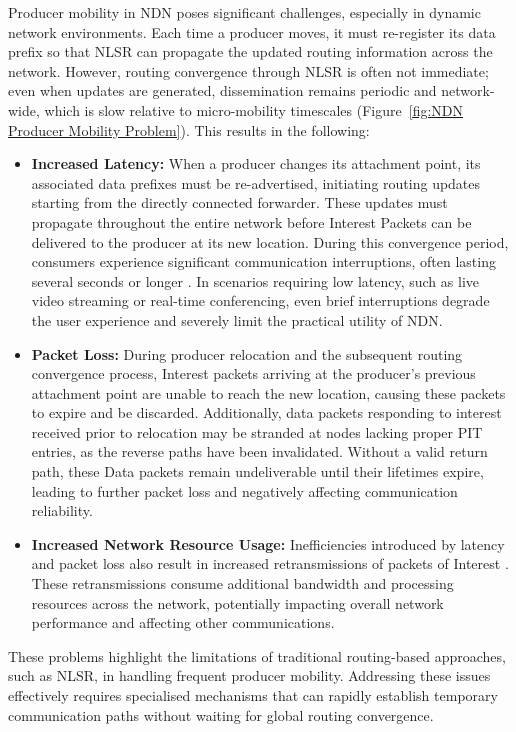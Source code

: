 \documentclass[10pt,conference]{IEEEtran}
\begin{document}
Producer mobility in NDN poses significant challenges, especially in dynamic network environments. Each time a producer moves, it must re-register its data prefix so that NLSR can propagate the updated routing information across the network. However, routing convergence through NLSR is often not immediate; even when updates are generated, dissemination remains periodic and network-wide, which is slow relative to micro-mobility timescales (Figure~\ref{fig:NDN Producer Mobility Problem}).
This results in the following:
\begin{itemize}
\item \textbf{Increased Latency:} When a producer changes its attachment point, its associated data prefixes must be re-advertised, initiating routing updates starting from the directly connected forwarder. These updates must propagate throughout the entire network before Interest Packets can be delivered to the producer at its new location. During this convergence period, consumers experience significant communication interruptions, often lasting several seconds or longer \cite{FIXME}. In scenarios requiring low latency, such as live video streaming or real-time conferencing, even brief interruptions degrade the user experience \cite{FIXME} and severely limit the practical utility of NDN.

\item \textbf{Packet Loss:} During producer relocation and the subsequent routing convergence process, Interest packets arriving at the producer's previous attachment point are unable to reach the new location, causing these packets to expire and be discarded. Additionally, data packets responding to interest received prior to relocation may be stranded at nodes lacking proper PIT entries, as the reverse paths have been invalidated. Without a valid return path, these Data packets remain undeliverable until their lifetimes expire, leading to further packet loss and negatively affecting communication reliability.

\item \textbf{Increased Network Resource Usage:} Inefficiencies introduced by latency and packet loss also result in increased retransmissions of packets of Interest \cite{FIXME}. These retransmissions consume additional bandwidth and processing resources across the network, potentially impacting overall network performance and affecting other communications.

\end{itemize}

These problems highlight the limitations of traditional routing-based approaches, such as NLSR, in handling frequent producer mobility. Addressing these issues effectively requires specialised mechanisms that can rapidly establish temporary communication paths without waiting for global routing convergence.
\end{document}
